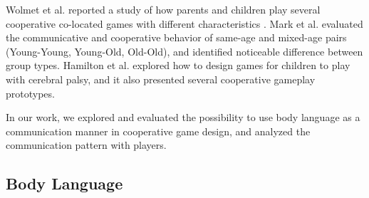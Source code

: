 Wolmet et al. reported a study of how parents and children play several cooperative co-located games with different characteristics \cite{CG5}. 
Mark et al. \cite{CG6} evaluated the communicative and cooperative behavior of same-age and mixed-age pairs (Young-Young, Young-Old, Old-Old), and identified noticeable difference between group types. 
Hamilton et al. \cite{CG7} explored how to design games for children to play with cerebral palsy, and it also presented several cooperative gameplay prototypes.



In our work, we explored and evaluated the possibility to use body language as a communication manner in cooperative game design, and analyzed the communication pattern with players.

\subsection{Body Language}


